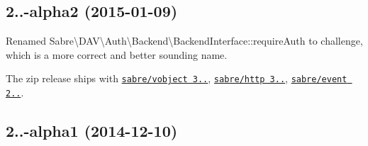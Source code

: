 \subsection*{2..-\/alpha2 (2015-\/01-\/09) }


\begin{DoxyItemize}
\item Renamed {\ttfamily Sabre\textbackslash{}D\+AV\textbackslash{}Auth\textbackslash{}Backend\textbackslash{}Backend\+Interface\+::require\+Auth} to {\ttfamily challenge}, which is a more correct and better sounding name.
\item The zip release ships with \href{http://sabre.io/vobject/}{\tt sabre/vobject 3..}, \href{http://sabre.io/http/}{\tt sabre/http 3..}, \href{http://sabre.io/event/}{\tt sabre/event 2..}.
\end{DoxyItemize}

\subsection*{2..-\/alpha1 (2014-\/12-\/10) }


